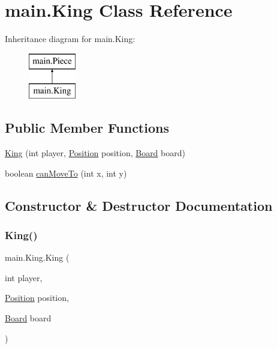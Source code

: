 \hypertarget{classmain_1_1_king}{}\section{main.\+King Class Reference}
\label{classmain_1_1_king}
Inheritance diagram for main.\+King\+:\begin{figure}[H]
\begin{center}
\leavevmode
\includegraphics[height=2.000000cm]{classmain_1_1_king}
\end{center}
\end{figure}
\subsection*{Public Member Functions}
\begin{DoxyCompactItemize}
\item 
\hyperlink{classmain_1_1_king_a7512b299fe9a8b4ebcad47208403ee59}{King} (int player, \hyperlink{classmain_1_1_position}{Position} position, \hyperlink{classmain_1_1_board}{Board} board)
\item 
boolean \hyperlink{classmain_1_1_king_a96e05b09b8fb578a359fc25fc0af9b1b}{can\+Move\+To} (int x, int y)
\end{DoxyCompactItemize}


\subsection{Constructor \& Destructor Documentation}
\mbox{\label{classmain_1_1_king_a7512b299fe9a8b4ebcad47208403ee59}} 
\subsubsection{\texorpdfstring{King()}{King()}}
{\footnotesize\ttfamily main.\+King.\+King (\begin{DoxyParamCaption}\item[{int}]{player,  }\item[{\hyperlink{classmain_1_1_position}{Position}}]{position,  }\item[{\hyperlink{classmain_1_1_board}{Board}}]{board }\end{DoxyParamCaption})}

